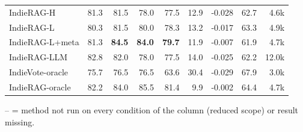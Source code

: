 \begin{table}[tbp]
\begin{tabular}{lrrrrrrrr}
IndieRAG-H & 81.3 & 81.5 & 78.0 & 77.5 & 12.9 & -0.028 & 62.7 & 4.6k \\
IndieRAG-L & 80.3 & 81.5 & 80.0 & 78.3 & 13.2 & -0.017 & 63.3 & 4.9k \\
IndieRAG-L+meta & 81.3 & \textbf{84.5} & \textbf{84.0} & \textbf{79.7} & 11.9 & -0.007 & 61.9 & 4.7k \\
IndieRAG-LLM & 82.8 & 82.0 & 78.0 & 77.5 & 14.0 & -0.025 & 62.2 & 12.0k \\
\midrule
IndieVote-oracle & 75.7 & 76.5 & 76.5 & 63.6 & 30.4 & -0.029 & 67.9 & 3.0k \\
IndieRAG-oracle & 82.2 & 84.0 & 85.5 & 81.4 & 9.9 & -0.002 & 64.4 & 4.7k \\
\bottomrule
\end{tabular}
\par\smallskip\parbox{\linewidth}{\footnotesize -- = method not run on every condition of the column (reduced scope) or result missing.}
\end{table}
